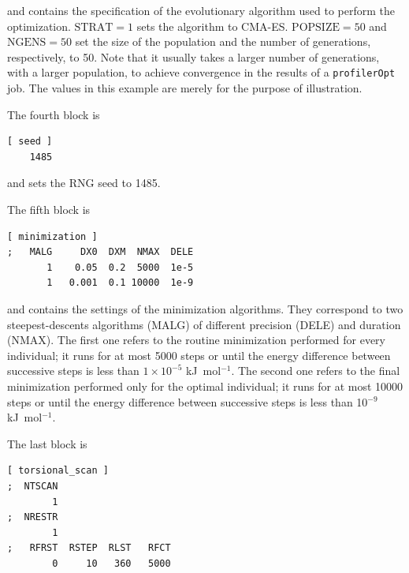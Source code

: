 \documentclass[10pt,a4paper,openany]{memoir}
\numberwithin{equation}{section}
\newcommand{\profileropt}[0]{\texttt{profilerOpt}}
\newcommand{\varset}[2]{$\text{#1}=#2$}
\begin{document}
\noindent and contains the specification of the evolutionary algorithm
used to perform the optimization.  \varset{STRAT}{1} sets the
algorithm to CMA-ES.  \varset{POPSIZE}{50} and \varset{NGENS}{50} set
the size of the population and the number of generations,
respectively, to 50. Note that it usually takes a larger number of
generations, with a larger population, to achieve convergence in the
results of a \profileropt{} job. The values in this example are merely
for the purpose of illustration.

The fourth block is

\begin{lstlisting}[language=gromacs]
[ seed ]
    1485
\end{lstlisting}\vspace{2ex}\par

\noindent and sets the RNG seed to 1485.

The fifth block is

\begin{lstlisting}[language=gromacs]
[ minimization ]
;   MALG     DX0  DXM  NMAX  DELE
       1    0.05  0.2  5000  1e-5
       1   0.001  0.1 10000  1e-9
\end{lstlisting}\vspace{2ex}\par

\noindent and contains the settings of the minimization algorithms.
They correspond to two steepest-descents algorithms (MALG) of
different precision (DELE) and duration (NMAX).
%
The first one refers to the routine minimization performed for every
individual; it runs for at most 5000 steps or until the energy
difference between successive steps is less than $1\times 10^{-5}$ kJ~mol$^{-1}$.
%
The second one refers to the final minimization performed only for the
optimal individual; it runs for at most 10000 steps or until the energy
difference between successive steps is less than 10$^{-9}$
kJ~mol$^{-1}$.
%

The last block is

\begin{lstlisting}[language=gromacs]
[ torsional_scan ]
;  NTSCAN
        1
;  NRESTR
        1
;   RFRST  RSTEP  RLST   RFCT
        0     10   360   5000
\end{lstlisting}\vspace{2ex}\par
\end{document}
